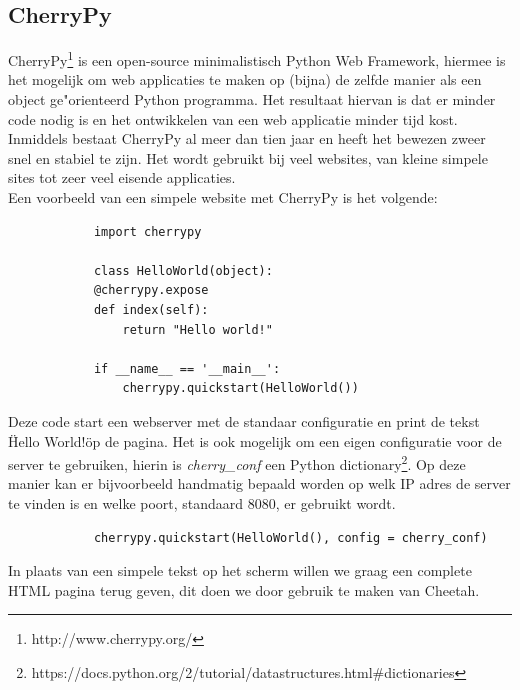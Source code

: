\documentclass[twoside,openright]{uva-bachelor-thesis}
\begin{document}
		\subsection{CherryPy}
			CherryPy\footnote{http://www.cherrypy.org/} is een open-source minimalistisch Python Web Framework, hiermee is het mogelijk om web applicaties te maken op (bijna) de zelfde manier als een object ge"orienteerd Python programma. Het resultaat hiervan is dat er minder code nodig is en het ontwikkelen van een web applicatie minder tijd kost.
			\\[0.5cm]
			Inmiddels bestaat CherryPy al meer dan tien jaar en heeft het bewezen zweer snel en stabiel te zijn. Het wordt gebruikt bij veel websites, van kleine simpele sites tot zeer veel eisende applicaties.
			\\[0.5cm]
			Een voorbeeld van een simpele website met CherryPy is het volgende:
			\begin{verbatim}
			import cherrypy
			
			class HelloWorld(object):
			@cherrypy.expose
			def index(self):
			    return "Hello world!"
			
			if __name__ == '__main__':
			    cherrypy.quickstart(HelloWorld())
			\end{verbatim}
			Deze code start een webserver met de standaar configuratie en print de tekst \"Hello World!\" op de pagina. Het is ook mogelijk om een eigen configuratie voor de server te gebruiken, hierin is \textit{cherry\_conf} een Python dictionary\footnote{https://docs.python.org/2/tutorial/datastructures.html\#dictionaries}. Op deze manier kan er bijvoorbeeld handmatig bepaald worden op welk IP adres de server te vinden is en welke poort, standaard $8080$, er gebruikt wordt. 
			\begin{verbatim}
			cherrypy.quickstart(HelloWorld(), config = cherry_conf)
			\end{verbatim}
			In plaats van een simpele tekst op het scherm willen we graag een complete HTML pagina terug geven, dit doen we door gebruik te maken van Cheetah.
\end{document}
